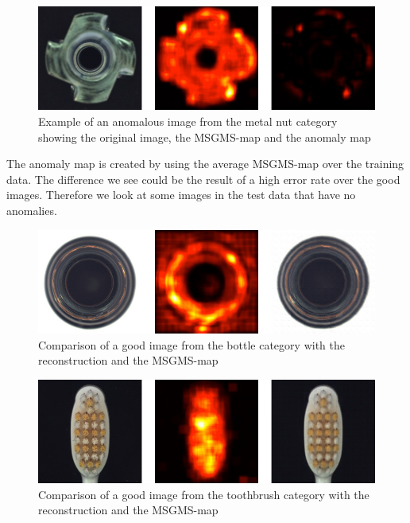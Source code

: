 \begin{figure}[ht!]
\centering
\includegraphics[width=\textwidth]{imgs/samples/metal-nut-ano-msgms.jpg}
\caption{Example of an anomalous image from the metal nut category showing the original image, the MSGMS-map and the anomaly map}
\label{fig:discussion:metal-nut-msgms}
\end{figure}

The anomaly map is created by using the average MSGMS-map over the training data. The difference we see could be the result of a high error rate over the good images. Therefore we look at some images in the test data that have no anomalies.

\begin{figure}[ht!]
\centering
\includegraphics[width=\textwidth]{imgs/samples/bottle-good.jpg}
\caption{Comparison of a good image from the bottle category with the reconstruction and the MSGMS-map}
\label{fig:discussion:bottle-good}
\end{figure}

\begin{figure}[ht!]
\centering
\includegraphics[width=\textwidth]{imgs/samples/toothbrush-good.jpg}
\caption{Comparison of a good image from the toothbrush category with the reconstruction and the MSGMS-map}
\label{fig:discussion:toothbrush-good}
\end{figure}

